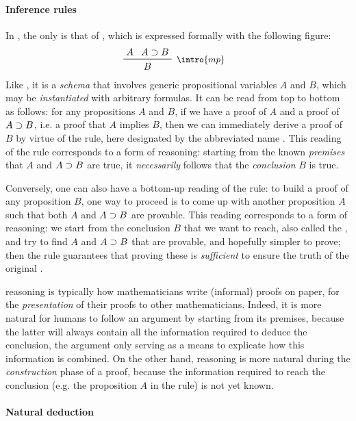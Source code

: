 \paragraph{Inference rules}

\AP
In , the only  is that of , which is expressed formally with the following figure:
$$\R[\intro{mp}]{A}{A \limp B}{B}$$
Like , it is a \emph{schema} that involves generic propositional variables
$A$ and $B$, which may be \emph{instantiated} with arbitrary formulas. It can be
read from top to bottom as follows: for any propositions $A$ and $B$, if we have
a proof of $A$ and a proof of $A \supset B$, i.e. a proof that $A$ implies $B$,
then we can immediately derive a proof of $B$ by virtue of the rule, here
designated by the abbreviated name . This reading of the rule
corresponds to a form of  reasoning: starting from the known
\emph{premises} that $A$ and $A \supset B$ are true, it \emph{necessarily} follows
that the \emph{conclusion} $B$ is true.

\AP
Conversely, one can also have a bottom-up reading of the rule: to build a proof
of any proposition $B$, one way to proceed is to come up with another
proposition $A$ such that both $A$ and $A \supset B$ are provable. This reading
corresponds to a form of  reasoning: we start from the conclusion
$B$ that we want to reach, also called the , and try to find
 $A$ and $A \supset B$ that are provable, and hopefully simpler to
prove; then the rule guarantees that proving these  is \emph{sufficient}
to ensure the truth of the original .

 reasoning is typically how mathematicians write (informal) proofs on
paper, for the \emph{presentation} of their proofs to other mathematicians.
Indeed, it is more natural for humans to follow an argument by starting from its
premises, because the latter will always contain all the information required to
deduce the conclusion, the argument only serving as a means to explicate how
this information is combined. On the other hand,  reasoning is more
natural during the \emph{construction} phase of a proof, because the information
required to reach the conclusion (e.g. the proposition $A$ in the  rule)
is not yet known.

\paragraph{Natural deduction}

